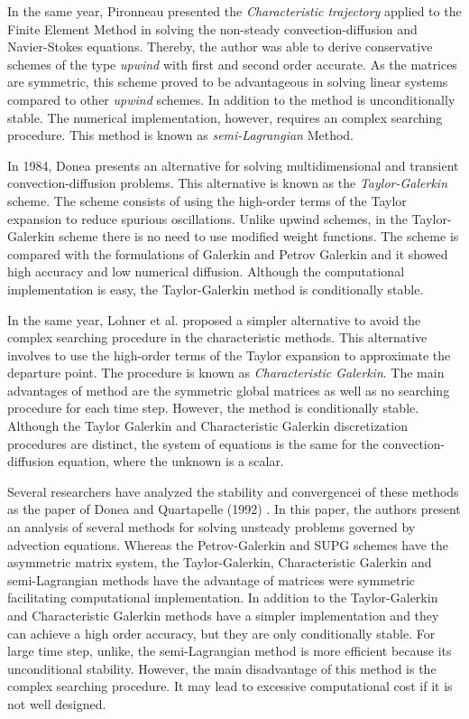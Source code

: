 \medskip
In the same year, Pironneau \cite{pironneau1982} presented
 the \textit{Characteristic trajectory}
 applied to the
 Finite Element Method in solving the non-steady convection-diffusion
 and Navier-Stokes equations. Thereby, the author was able
 to derive conservative schemes of the type \textit{upwind}
 with first and second order accurate. As the matrices are symmetric,
 this scheme proved to be advantageous in solving linear
 systems compared to other \textit{upwind} schemes.
 In addition to the method is unconditionally stable.
 The numerical implementation, however, requires an complex searching
 procedure. This method is known as \textit{semi-Lagrangian} Method.

\medskip
In 1984, Donea \cite{donea1984} presents an alternative for
 solving multidimensional and transient convection-diffusion
 problems. This alternative is known as the
 \textit{Taylor-Galerkin} scheme. The scheme consists of using
 the high-order terms of the Taylor expansion to reduce
 spurious oscillations. Unlike upwind schemes, in the
 Taylor-Galerkin scheme there is no need to use modified
 weight functions. The scheme is compared with the formulations
 of Galerkin and Petrov Galerkin and it showed high accuracy and
 low numerical diffusion. 
Although the computational implementation is easy,
the Taylor-Galerkin method
 is conditionally stable.

\medskip
In the same year, Lohner et al. \cite{lohner1984} 
proposed a simpler alternative
to avoid the complex searching procedure in the characteristic
methods. This alternative involves to use the high-order terms of
the Taylor expansion to approximate the departure point.
The procedure is known as \textit{Characteristic Galerkin}.
The main advantages of method are the symmetric global matrices
as well as no searching procedure for each time step. However, the
method is conditionally stable.
Although the Taylor Galerkin and
 Characteristic Galerkin discretization procedures are distinct,
 the system of equations is the same for the convection-diffusion
 equation, where the unknown is a scalar.


\medskip
Several researchers have analyzed the stability and convergencei
 of these methods as the paper of Donea and Quartapelle (1992)
\cite{donea1992}. In this paper, the authors present an analysis
of several methods for solving unsteady problems governed by
advection equations. 
Whereas the Petrov-Galerkin and
 SUPG schemes have the asymmetric matrix system, 
 the Taylor-Galerkin, Characteristic Galerkin and
 semi-Lagrangian methods have the advantage of matrices were
 symmetric facilitating computational implementation.
 In addition to the Taylor-Galerkin and Characteristic Galerkin methods
 have a simpler implementation and they can achieve a high order
accuracy, but they are only conditionally stable.
 For large time step, unlike, the semi-Lagrangian method is
 more efficient because its unconditional stability.
 However, the main disadvantage of this method is the complex 
 searching procedure. It may lead to excessive computational cost
 if it is not well designed.

